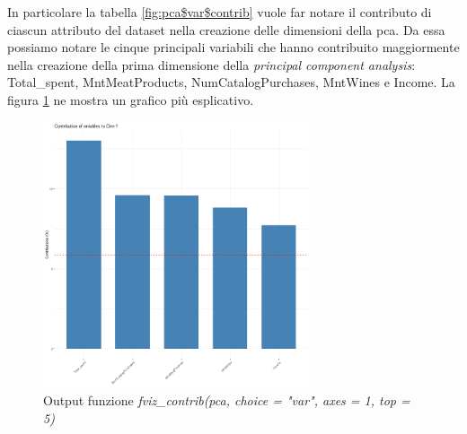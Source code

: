 \documentclass[letterpaper,11pt]{article}
\begin{document}
In particolare la tabella \ref{fig:pca$var$contrib} vuole far notare il contributo di ciascun attributo del dataset nella creazione delle dimensioni della pca. Da essa possiamo notare le cinque principali variabili che hanno contribuito maggiormente nella creazione della prima dimensione della \textit{principal component analysis}: Total\_spent, MntMeatProducts, NumCatalogPurchases, MntWines e Income. La figura \ref{fig:fviz_contrib(pca, choice = "var", axes = 1, top = 5)} ne mostra un grafico più esplicativo.
\begin{figure}[H]
    \centering
    \includegraphics[width=0.7\textwidth]{Img/PCA/PCA002.png}
    \caption{Output funzione \textit{fviz\_contrib(pca, choice = "var", axes = 1, top = 5)}}
    \label{fig:fviz_contrib(pca, choice = "var", axes = 1, top = 5)}
\end{figure}
\end{document}

